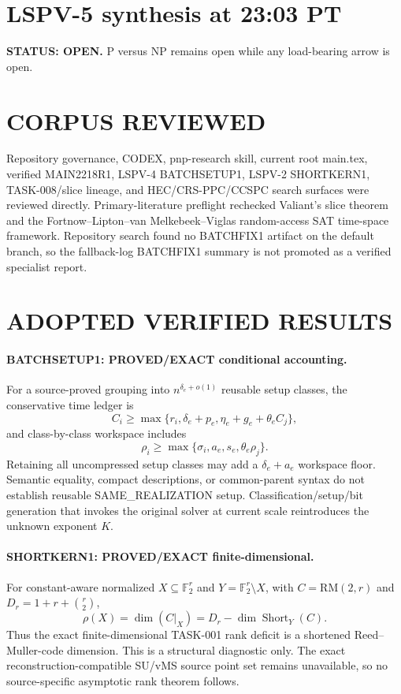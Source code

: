 \documentclass[11pt]{article}
\begin{document}
\section*{LSPV-5 synthesis at 23:03 PT}
\textbf{STATUS: OPEN.} P versus NP remains open while any load-bearing arrow is open.

\section*{CORPUS REVIEWED}
Repository governance, CODEX, pnp-research skill, current root main.tex, verified MAIN2218R1, LSPV-4 BATCHSETUP1, LSPV-2 SHORTKERN1, TASK-008/slice lineage, and HEC/CRS-PPC/CCSPC search surfaces were reviewed directly. Primary-literature preflight rechecked Valiant's slice theorem and the Fortnow--Lipton--van Melkebeek--Viglas random-access SAT time-space framework. Repository search found no BATCHFIX1 artifact on the default branch, so the fallback-log BATCHFIX1 summary is not promoted as a verified specialist report.

\section*{ADOPTED VERIFIED RESULTS}
\paragraph{BATCHSETUP1: PROVED/EXACT conditional accounting.} For a source-proved grouping into $n^{\delta_e+o(1)}$ reusable setup classes, the conservative time ledger is
\[
C_i\ge\max\{r_i,\delta_e+p_e,\eta_e+g_e+\theta_e C_j\},
\]
and class-by-class workspace includes
\[
\rho_i\ge\max\{\sigma_i,a_e,s_e,\theta_e\rho_j\}.
\]
Retaining all uncompressed setup classes may add a $\delta_e+a_e$ workspace floor. Semantic equality, compact descriptions, or common-parent syntax do not establish reusable SAME\_REALIZATION setup. Classification/setup/bit generation that invokes the original solver at current scale reintroduces the unknown exponent $K$.

\paragraph{SHORTKERN1: PROVED/EXACT finite-dimensional.} For constant-aware normalized $X\subseteq\mathbb F_2^r$ and $Y=\mathbb F_2^r\setminus X$, with $C=\mathrm{RM}(2,r)$ and $D_r=1+r+\binom r2$,
\[
\rho(X)=\dim(C|_X)=D_r-\dim\operatorname{Short}_Y(C).
\]
Thus the exact finite-dimensional TASK-001 rank deficit is a shortened Reed--Muller-code dimension. This is a structural diagnostic only. The exact reconstruction-compatible SU/vMS source point set remains unavailable, so no source-specific asymptotic rank theorem follows.
\end{document}
